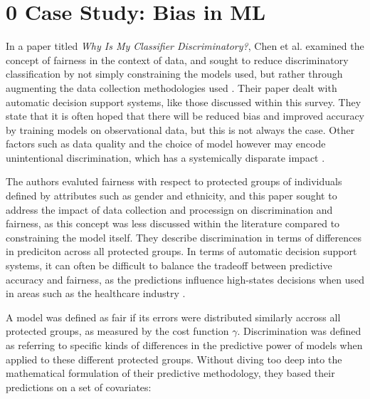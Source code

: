 \documentclass[12pt]{article}
\begin{document}




\section{\hspace{-3mm} 0  Case Study: Bias in ML}

In a paper titled \textit{Why Is My Classifier Discriminatory?}, Chen et al. examined the concept of fairness in the context of data, and sought to reduce discriminatory classification by not simply constraining the models used, but rather through augmenting the data collection methodologies used \citep{Chen_2018}. Their paper dealt with automatic decision support systems, like those discussed within this survey. They state that it is often hoped that there will be reduced bias and improved accuracy by training models on observational data, but this is not always the case. Other factors such as data quality and the choice of model however may encode unintentional discrimination, which has a systemically disparate impact \citep{Chen_2018}.\

The authors evaluted fairness with respect to protected groups of individuals defined by attributes such as gender and ethnicity, and this paper sought to address the impact of data collection and processign on discrimination and fairness, as this concept was less discussed within the literature compared to constraining the model itself. They describe discrimination in terms of differences in prediciton across all protected groups. In terms of automatic decision support systems, it can often be difficult to balance the tradeoff between predictive accuracy and fairness, as the predictions influence high-states decisions when used in areas such as the healthcare industry \citep{Chen_2018}.\

A model was defined as fair if its errors were distributed similarly accross all protected groups, as measured by the cost function $\gamma$. Discrimination was defined as referring to specific kinds of differences in the predictive power of models when applied to these different protected groups. Without diving too deep into the mathematical formulation of their predictive methodology, they based their predictions on a set of covariates:
\end{document}
